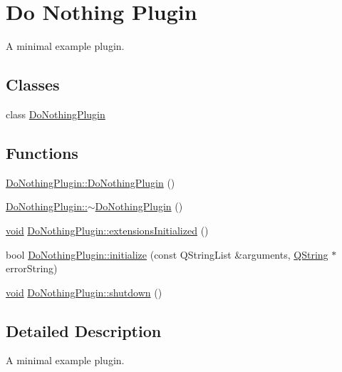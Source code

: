 \hypertarget{group___do_nothing_plugin}{\section{\-Do \-Nothing \-Plugin}
\label{group___do_nothing_plugin}
}


\-A minimal example plugin.  


\subsection*{\-Classes}
\begin{DoxyCompactItemize}
\item 
class \hyperlink{class_do_nothing_plugin}{\-Do\-Nothing\-Plugin}
\end{DoxyCompactItemize}
\subsection*{\-Functions}
\begin{DoxyCompactItemize}
\item 
\hyperlink{group___do_nothing_plugin_ga5a69c051df33ad86daa499ac440b9097}{\-Do\-Nothing\-Plugin\-::\-Do\-Nothing\-Plugin} ()
\item 
\hyperlink{group___do_nothing_plugin_gad61344cbd9fb9103b6e3b8f6da089030}{\-Do\-Nothing\-Plugin\-::$\sim$\-Do\-Nothing\-Plugin} ()
\item 
\hyperlink{group___u_a_v_objects_plugin_ga444cf2ff3f0ecbe028adce838d373f5c}{void} \hyperlink{group___do_nothing_plugin_ga82d133252a7e9bba0308a0a2674541f3}{\-Do\-Nothing\-Plugin\-::extensions\-Initialized} ()
\item 
bool \hyperlink{group___do_nothing_plugin_ga5038a5ac3f0abbd6c99a369d6d2ee9f4}{\-Do\-Nothing\-Plugin\-::initialize} (const \-Q\-String\-List \&arguments, \hyperlink{group___u_a_v_objects_plugin_gab9d252f49c333c94a72f97ce3105a32d}{\-Q\-String} $\ast$error\-String)
\item 
\hyperlink{group___u_a_v_objects_plugin_ga444cf2ff3f0ecbe028adce838d373f5c}{void} \hyperlink{group___do_nothing_plugin_gaa91993d8fa19262963650daf59993688}{\-Do\-Nothing\-Plugin\-::shutdown} ()
\end{DoxyCompactItemize}


\subsection{\-Detailed \-Description}
\-A minimal example plugin. 

